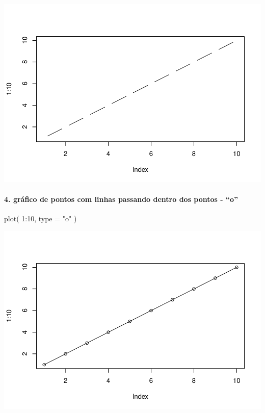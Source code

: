 \documentclass[
]{article}
\newenvironment{Shaded}{\begin{snugshade}}{\end{snugshade}}
\newcommand{\AttributeTok}[1]{\textcolor[rgb]{0.77,0.63,0.00}{#1}}
\newcommand{\DecValTok}[1]{\textcolor[rgb]{0.00,0.00,0.81}{#1}}
\newcommand{\FunctionTok}[1]{\textcolor[rgb]{0.00,0.00,0.00}{#1}}
\newcommand{\NormalTok}[1]{#1}
\newcommand{\SpecialCharTok}[1]{\textcolor[rgb]{0.00,0.00,0.00}{#1}}
\newcommand{\StringTok}[1]{\textcolor[rgb]{0.31,0.60,0.02}{#1}}
\begin{document}
\includegraphics{presencial_função_plot_04_turma_B_files/figure-latex/unnamed-chunk-4-1.pdf}

\hypertarget{gruxe1fico-de-pontos-com-linhas-passando-dentro-dos-pontos---o}{%
\paragraph{4. gráfico de pontos com linhas passando dentro dos pontos -
``o''}\label{gruxe1fico-de-pontos-com-linhas-passando-dentro-dos-pontos---o}}

\begin{Shaded}
\begin{Highlighting}[]
\FunctionTok{plot}\NormalTok{( }\DecValTok{1}\SpecialCharTok{:}\DecValTok{10}\NormalTok{, }\AttributeTok{type =} \StringTok{"o"}\NormalTok{ )}
\end{Highlighting}
\end{Shaded}

\includegraphics{presencial_função_plot_04_turma_B_files/figure-latex/unnamed-chunk-5-1.pdf}
\end{document}
